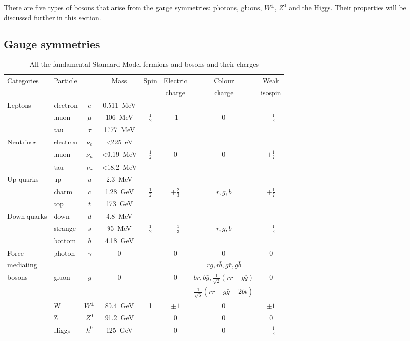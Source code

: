 There are five types of bosons that arise from the \SM gauge
symmetries: photons, gluons, $W^{\pm}$, $Z^0$ and the Higgs. Their
properties will be discussed further in this section.

\subsection{Gauge symmetries}

\begin{table}[htbp!]
\begin{tabular}{l|l c|c|c|c|c|c}
Categories & Particle & & Mass & Spin & Electric & Colour & Weak \\
 &  & & & & charge & charge & isospin \\
\hline
\hline
Leptons & electron & $e$ & 0.511~MeV & & & & \\
                & muon & $\mu$ & 106~MeV & $\frac{1}{2}$ & -1  & 0 &  $-\frac{1}{2}$\\
                & tau & $\tau$ & 1777~MeV  & &   &  &  \\
\hline
Neutrinos & electron & $\nu_e$ & <225~eV & & & & \\
                & muon & $\nu_{\mu}$ & <0.19~MeV & $\frac{1}{2}$  & 0  & 0 &  $+\frac{1}{2}$\\
                & tau & $\nu_{\tau}$ & <18.2~MeV &  &   &  &  \\
\hline
Up quarks & up & $u$ & 2.3~MeV & & & \\
                & charm & $c$ & 1.28~GeV & $\frac{1}{2}$ & $+\frac{2}{3}$  & $r,g,b$ &  $+\frac{1}{2}$\\
                & top & $t$ & 173~GeV  &   &  &  \\
\hline
Down quarks & down & $d$ & 4.8~MeV & & & & \\
                & strange & $s$ & 95~MeV & $\frac{1}{2}$ & $-\frac{1}{3}$  & $r,g,b$ &  $-\frac{1}{2}$\\
                & bottom & $b$ & 4.18~GeV &  &   &  &  \\
\hline
Force & photon & $\gamma$ & 0 &  & 0 & 0 & 0 \\
\cline{2-8}
 mediating &  &  &  &  &  & $r\bar{g},r\bar{b},g\bar{r},g\bar{b}$\\
 bosons & gluon & $g$ & 0 &  & 0 & $b\bar{r},b\bar{g},
\frac{1}{\sqrt{2}}(r\bar{r}-g\bar{g})$ & 0 \\
 & &  &  &  &  & $\frac{1}{\sqrt{6}}(r\bar{r}+g\bar{g}-2b\bar{b})$ &  \\
\cline{2-8}
 & W & $W^{\pm}$ & 80.4~GeV & 1 & $\pm 1$ & 0 & $\pm 1$ \\
 & Z & $Z^0$ & 91.2~GeV &  & 0 & 0 & 0 \\
 & Higgs & $h^0$ & 125~GeV &  & 0 & 0 & $-\frac{1}{2}$ \\
\end{tabular}
\caption{All the fundamental Standard Model fermions and bosons and their charges
\cite{PhysRevD.86.010001}}
\label{tab:smParticles}
\end{table}


